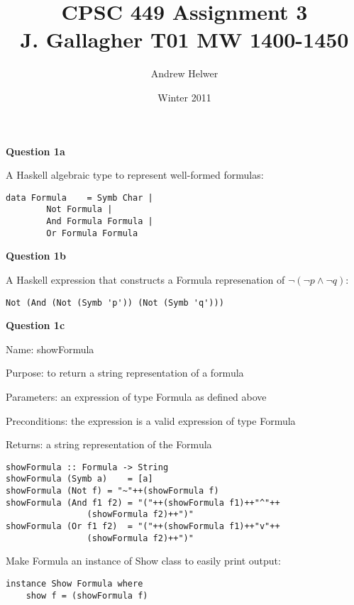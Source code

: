 \documentclass{article}
\begin{document}
\lstset{language=Haskell, frame=single}

\title{CPSC 449 Assignment 3 \\ J. Gallagher T01 MW 1400-1450}
\author{Andrew Helwer}
\date{Winter 2011}
\maketitle

\section{}

\textbf{Question 1a}

A Haskell algebraic type to represent well-formed formulas:

\begin{lstlisting}
data Formula 	= Symb Char |
 		Not Formula |
 		And Formula Formula |
 		Or Formula Formula
\end{lstlisting}

\textbf{Question 1b}

A Haskell expression that constructs a Formula represenation of $\neg(\neg p
\wedge \neg q)$:

\begin{lstlisting}
Not (And (Not (Symb 'p')) (Not (Symb 'q')))
\end{lstlisting}

\textbf{Question 1c}

Name: showFormula

Purpose: to return a string representation of a formula

Parameters: an expression of type Formula as defined above

Preconditions: the expression is a valid expression of type Formula

Returns: a string representation of the Formula

\begin{lstlisting}
showFormula :: Formula -> String
showFormula (Symb a)	= [a]
showFormula (Not f)	= "~"++(showFormula f)
showFormula (And f1 f2)	= "("++(showFormula f1)++"^"++
				(showFormula f2)++")"
showFormula (Or f1 f2)	= "("++(showFormula f1)++"v"++
				(showFormula f2)++")"
\end{lstlisting}

Make Formula an instance of Show class to easily print output:

\begin{lstlisting}
instance Show Formula where
    show f = (showFormula f)
\end{lstlisting}
\end{document}
